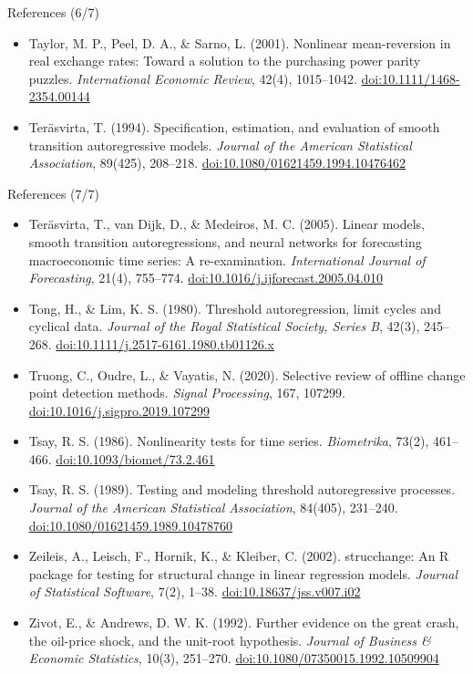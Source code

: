 \begin{frame}{References (6/7)}
\begin{itemize}
    \item Taylor, M. P., Peel, D. A., \& Sarno, L. (2001). Nonlinear mean-reversion in real exchange rates: Toward a solution to the purchasing power parity puzzles. \textit{International Economic Review}, 42(4), 1015--1042. \href{https://doi.org/10.1111/1468-2354.00144}{doi:10.1111/1468-2354.00144}
    \item Teräsvirta, T. (1994). Specification, estimation, and evaluation of smooth transition autoregressive models. \textit{Journal of the American Statistical Association}, 89(425), 208--218. \href{https://doi.org/10.1080/01621459.1994.10476462}{doi:10.1080/01621459.1994.10476462}
\end{itemize}
\end{frame}

\begin{frame}{References (7/7)}
\itemsize{\tiny}
\begin{itemize}
    \item Teräsvirta, T., van Dijk, D., \& Medeiros, M. C. (2005). Linear models, smooth transition autoregressions, and neural networks for forecasting macroeconomic time series: A re-examination. \textit{International Journal of Forecasting}, 21(4), 755--774. \href{https://doi.org/10.1016/j.ijforecast.2005.04.010}{doi:10.1016/j.ijforecast.2005.04.010}
    \item Tong, H., \& Lim, K. S. (1980). Threshold autoregression, limit cycles and cyclical data. \textit{Journal of the Royal Statistical Society, Series B}, 42(3), 245--268. \href{https://doi.org/10.1111/j.2517-6161.1980.tb01126.x}{doi:10.1111/j.2517-6161.1980.tb01126.x}
    \item Truong, C., Oudre, L., \& Vayatis, N. (2020). Selective review of offline change point detection methods. \textit{Signal Processing}, 167, 107299. \href{https://doi.org/10.1016/j.sigpro.2019.107299}{doi:10.1016/j.sigpro.2019.107299}
    \item Tsay, R. S. (1986). Nonlinearity tests for time series. \textit{Biometrika}, 73(2), 461--466. \href{https://doi.org/10.1093/biomet/73.2.461}{doi:10.1093/biomet/73.2.461}
    \item Tsay, R. S. (1989). Testing and modeling threshold autoregressive processes. \textit{Journal of the American Statistical Association}, 84(405), 231--240. \href{https://doi.org/10.1080/01621459.1989.10478760}{doi:10.1080/01621459.1989.10478760}
    \item Zeileis, A., Leisch, F., Hornik, K., \& Kleiber, C. (2002). strucchange: An R package for testing for structural change in linear regression models. \textit{Journal of Statistical Software}, 7(2), 1--38. \href{https://doi.org/10.18637/jss.v007.i02}{doi:10.18637/jss.v007.i02}
    \item Zivot, E., \& Andrews, D. W. K. (1992). Further evidence on the great crash, the oil-price shock, and the unit-root hypothesis. \textit{Journal of Business \& Economic Statistics}, 10(3), 251--270. \href{https://doi.org/10.1080/07350015.1992.10509904}{doi:10.1080/07350015.1992.10509904}
\end{itemize}
\end{frame}


